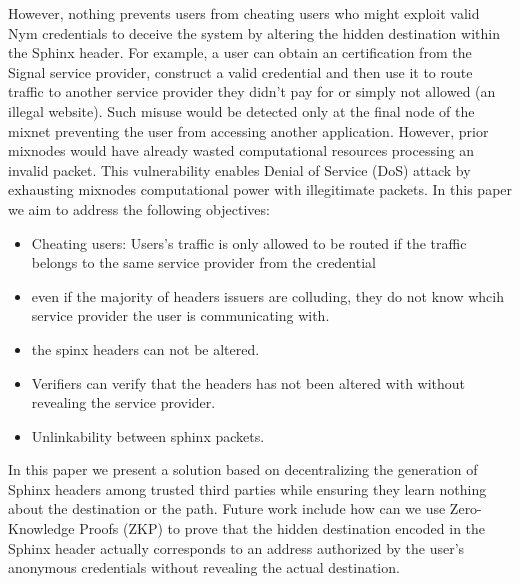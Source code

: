 However, nothing prevents users from cheating users who might exploit valid Nym credentials to deceive the system by altering the hidden destination within the Sphinx header. For example, a user can obtain an certification from the Signal service provider, construct a valid credential and then use it to route traffic to another service provider they didn't pay for or simply not allowed (an illegal website).
Such misuse would be detected only at the final node of the mixnet preventing the user from accessing another application. 
However, prior mixnodes would have already wasted computational resources processing an invalid packet. 
This vulnerability enables Denial of Service (DoS) attack by exhausting mixnodes computational power with illegitimate packets.
\newline
In this paper we aim to address the following objectives:
\begin{itemize}
	\item Cheating users: Users's traffic is only allowed to be routed if the traffic belongs to the same service provider from the credential
	\item even if the majority of headers issuers are colluding, they do not know whcih service provider the user is communicating with.
	\item the spinx headers can not be altered.
	\item Verifiers can verify that the headers has not been altered with without revealing the service provider.
	\item Unlinkability between  sphinx packets.
\end{itemize}


In this paper we present a solution based on decentralizing the generation of Sphinx headers among trusted third parties while ensuring they learn nothing about the destination or the path. Future work include how can we use Zero-Knowledge Proofs (ZKP) to prove that the hidden destination encoded in the Sphinx header actually corresponds to an address authorized by the user’s anonymous credentials without revealing the actual destination. 